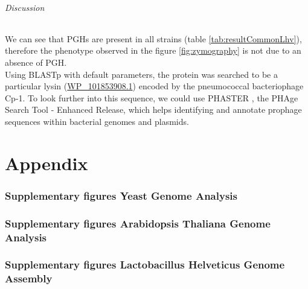 \documentclass[10pt,a4paper]{article}
\begin{document}





\paragraph{Discussion} We can see that PGHs are present in all strains (table \ref{tab:resultCommonLhv}), therefore the phenotype observed in the figure \ref{fig:zymography} is not due to an absence of PGH.\\

Using BLASTp\cite{altschul_gapped_1997} with default parameters, the protein was searched to be a particular lysin (\href{https://www.ncbi.nlm.nih.gov/protein/1325986555}{WP\_101853908.1}) encoded by the pneumococcal bacteriophage Cp-1\cite{martin_pneumococcal_1998}. To look further into this sequence, we could use PHASTER \cite{arndt_phaster:_2016}, the PHAge Search Tool - Enhanced Release, which helps identifying and annotate prophage sequences within bacterial genomes and plasmids. 



\newpage
{}


\newpage
\appendix
\part{Appendix}
\section{Supplementary figures Yeast Genome Analysis}


\section{Supplementary figures Arabidopsis Thaliana Genome Analysis}


\section{Supplementary figures Lactobacillus Helveticus Genome Assembly}
\end{document}
